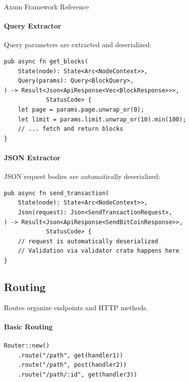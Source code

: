 \begin{deepdive}{Axum Framework Reference}
\paragraph{Query Extractor}

Query parameters are extracted and deserialized:

\begin{listing}[H]
\caption{Query parameter extraction}
\label{lst:axum-query-extractor}
\begin{verbatim}
pub async fn get_blocks(
    State(node): State<Arc<NodeContext>>,
    Query(params): Query<BlockQuery>,
) -> Result<Json<ApiResponse<Vec<BlockResponse>>>,
            StatusCode> {
    let page = params.page.unwrap_or(0);
    let limit = params.limit.unwrap_or(10).min(100);
    // ... fetch and return blocks
}
\end{verbatim}
\end{listing}

\paragraph{JSON Extractor}

JSON request bodies are automatically deserialized:

\begin{listing}[H]
\caption{JSON body extraction}
\label{lst:axum-json-extractor}
\begin{verbatim}
pub async fn send_transaction(
    State(node): State<Arc<NodeContext>>,
    Json(request): Json<SendTransactionRequest>,
) -> Result<Json<ApiResponse<SendBitCoinResponse>>,
            StatusCode> {
    // request is automatically deserialized
    // Validation via validator crate happens here
}
\end{verbatim}
\end{listing}

\subsection{Routing}

Routes organize endpoints and HTTP methods.

\paragraph{Basic Routing}

\begin{listing}[H]
\caption{Basic route definitions}
\label{lst:axum-routing}
\begin{verbatim}
Router::new()
    .route("/path", get(handler1))
    .route("/path", post(handler2))
    .route("/path/:id", get(handler3))
\end{verbatim}
\end{listing}


\end{deepdive}

